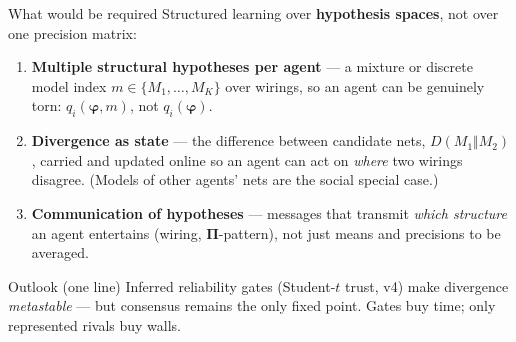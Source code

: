\documentclass[aspectratio=169,11pt]{beamer}
\newcommand{\Pii}{\bm{\Pi}}
\begin{document}
\begin{frame}{What would be required}
  Structured learning over \textbf{hypothesis spaces}, not over one precision
  matrix:
  \begin{enumerate}
    \small
    \item \textbf{Multiple structural hypotheses per agent} --- a mixture or
      discrete model index $m \in \{M_1, \dots, M_K\}$ over wirings, so an
      agent can be genuinely torn: $q_i(\bm{\varphi}, m)$, not $q_i(\bm{\varphi})$.
    \item \textbf{Divergence as state} --- the difference between candidate
      nets, $D(M_1 \Vert M_2)$, carried and updated online so an agent can
      act on \emph{where} two wirings disagree. (Models of other agents'
      nets are the social special case.)
    \item \textbf{Communication of hypotheses} --- messages that transmit
      \emph{which structure} an agent entertains (wiring, $\Pii$-pattern), not
      just means and precisions to be averaged.
  \end{enumerate}
  \vspace{0.3em}
  \begin{block}{Outlook (one line)}
    \small Inferred reliability gates (Student-$t$ trust, v4) make divergence
    \emph{metastable} --- but consensus remains the only fixed point. Gates buy
    time; only represented rivals buy walls.
  \end{block}
\end{frame}
\end{document}
